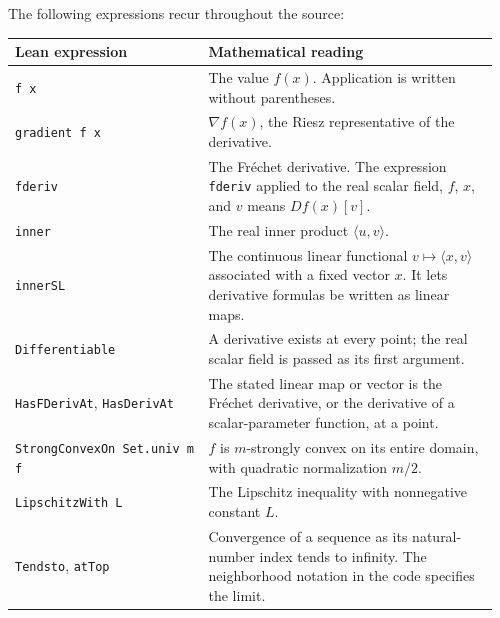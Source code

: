 \documentclass[11pt,a4paper]{article}
\newcommand{\ip}[2]{\langle #1,#2\rangle}
\newcommand{\lean}[1]{\ifmmode\text{\nolinkurl{#1}}\else\nolinkurl{#1}\fi}
\begin{document}
The following expressions recur throughout the source:
\begin{longtable}{@{}p{0.38\linewidth}p{0.58\linewidth}@{}}
\toprule
Lean expression & Mathematical reading\\
\midrule
\endhead
\lean{f x} & The value $f(x)$. Application is written without parentheses.\\
\lean{gradient f x} & $\nabla f(x)$, the Riesz representative of the derivative.\\
\lean{fderiv} & The Fr\'echet derivative. The expression \lean{fderiv} applied to
the real scalar field, $f$, $x$, and $v$ means $Df(x)[v]$.\\
\lean{inner} & The real inner product $\ip{u}{v}$.\\
\lean{innerSL} & The continuous linear functional $v\mapsto\ip{x}{v}$ associated
with a fixed vector $x$. It lets derivative formulas be written as linear maps.\\
\lean{Differentiable} & A derivative exists at every point; the real scalar field
is passed as its first argument.\\
\lean{HasFDerivAt}, \lean{HasDerivAt} & The stated linear map or vector is the
Fr\'echet derivative, or the derivative of a scalar-parameter function, at a point.\\
\lean{StrongConvexOn Set.univ m f} & $f$ is $m$-strongly convex on its entire domain,
with quadratic normalization $m/2$.\\
\lean{LipschitzWith L} & The Lipschitz inequality with nonnegative constant $L$.\\
\lean{Tendsto}, \lean{atTop} & Convergence of a sequence as its natural-number
index tends to infinity. The neighborhood notation in the code specifies the limit.\\
\bottomrule
\end{longtable}
\end{document}
